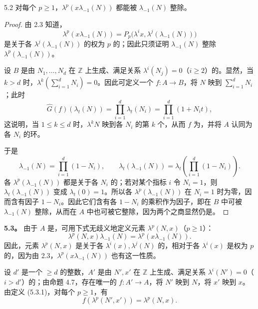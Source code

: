 \begin{SGAresult}{}{5.2}
对每个 $p\geqslant1$，$\lambda^p(x\lambda_{-1}(N))$ 都能被 $\lambda_{-1}(N)$ 整除。
\end{SGAresult}
\begin{proof}
由 2.3 知道，
\[
\lambda^p(x\lambda_{-1}(N))=P_p\bigl(\lambda^ix,\lambda^j(\lambda_{-1}(N))\bigr)
\]
是关于各 $\lambda^j(\lambda_{-1}(N))$ 的权为 $p$ 的；因此只须证明 $\lambda_{-1}(N)$ 整除 $\lambda^p(\lambda_{-1}(N))$。

设 $B$ 是由 $N_1,\ldots,N_d$ 在 $\mathbb Z$ 上生成、满足关系 $\lambda^i(N_j)=0$（$i\geqslant2$）的。显然，当 $k>d$ 时，$\lambda^k(\sum_{i=1}^dN_i)=0$。因此可定义一个 $f:A\longrightarrow B$，将 $N$ 映到 $\sum_{i=1}^dN_i$；此时
\[
\widehat G(f)(\lambda_t(N))=\prod_{i=1}^d\lambda_t(N_i)=\prod_{i=1}^d(1+N_it),
\]
这说明，当 $1\leqslant k\leqslant d$ 时，$\lambda^kN$ 映到各 $N_i$ 的第 $k$ 个，从而 $f$ 为，并将 $A$ 认同为各 $N_i$ 的环。

于是
\[
\lambda_{-1}(N)=\prod_{i=1}^d(1-N_i),\qquad
\lambda_t(\lambda_{-1}(N))=\lambda_t\left(\prod_{i=1}^d(1-N_i)\right).
\]
各 $\lambda^p(\lambda_{-1}(N))$ 都是关于各 $N_i$ 的；若对某个指标 $i$ 令 $N_i=1$，则 $\lambda_t(\lambda_{-1}(N))$ 变成 $\lambda_t(0)=1$。所以各 $\lambda^p(\lambda_{-1}(N))$ 在 $N_i=1$ 时为零，因而含有因子 $1-N_i$。因此它们含有各 $1-N_i$ 的乘积作为因子，即在 $B$ 中可被 $\lambda_{-1}(N)$ 整除，从而在 $A$ 中也可被它整除，因为两个之商显然仍是。
\end{proof}

\textbf{5.3。} 由于 $A$ 是，可用下式无歧义地定义元素 $\lambda^p(N,x)$（$p\geqslant1$）：
\[
\lambda^p(N,x)\lambda_{-1}(N)=\lambda^p(x\lambda_{-1}(N)).
\tag{5.3.1}
\]
因此，元素 $\lambda^p(N,x)$ 是关于各 $\lambda^i(x),\lambda^j(N)$ 的，相对于各 $\lambda^i(x)$ 是权为 $p$ 的，因为由 2.3，$\lambda^p(x\lambda_{-1}(N))$ 也有这一性质。

设 $d'$ 是一个 $\geqslant d$ 的整数，$A'$ 是由 $N',x'$ 在 $\mathbb Z$ 上生成、满足关系 $\lambda^i(N')=0$（$i>d'$）的；由命题 4.7，存在唯一的 $f:A'\longrightarrow A$，将 $N'$ 映到 $N$，将 $x'$ 映到 $x$。由定义 (5.3.1)，对每个 $p\geqslant1$，有
\[
f(\lambda^p(N',x'))=\lambda^p(N,x).
\]

